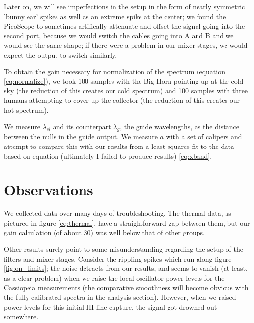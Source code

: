 \documentclass[12pt]{article}
\begin{document}
Later on, we will see imperfections in the setup in the form of nearly symmetric 'bunny ear' spikes as well as an extreme spike at the center; we found the PicoScope to sometimes artifically attenuate and offset the signal going into the second port, because we would switch the cables going into A and B and we would see the same shape; if there were a problem in our mixer stages, we would expect the output to switch similarly. 

To obtain the gain necessary for normalization of the spectrum (equation \ref{eq:normalize}), we took 100 samples with the Big Horn pointing up at the cold sky (the reduction of this creates our cold spectrum) and 100 samples with three humans attempting to cover up the collector (the reduction of this creates our hot spectrum).

We measure $\lambda_{sl}$ and its counterpart $\lambda_g$, the guide wavelengths, as the distance between the nulls in the guide output. We measure $a$ with a set of calipers and attempt to compare this with our results from a least-squares fit to the data based on equation (ultimately I failed to produce results) \ref{eq:xband}.

\section{Observations}



\quad \quad We collected data over many days of troubleshooting. The thermal data, as pictured in figure \ref{eq:thermal}, have a straightforward gap between them, but our gain calculation (of about 30) was well below that of other groups.

Other results surely point to some misunderstanding regarding the setup of the filters and mixer stages. Consider the rippling spikes which run along figure \ref{fig:on_limits}; the noise detracts from our results, and seems to vanish (at least, as a clear problem) when we raise the local oscillator power levels for the Cassiopeia measurements (the comparative smoothness will become obvious with the fully calibrated spectra in the analysis section). However, when we raised power levels for this initial HI line capture, the signal got drowned out somewhere.
\end{document}
